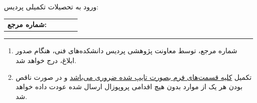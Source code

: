 \documentclass[a4paper,12pt]{article}
\begin{document}
\begin{center}
		\vspace{1.5cm}
		
		\begin{flushright}
			\hspace{2.5cm} ورود به تحصیلات تکمیلی پردیس:
		\end{flushright}
		
		\vspace{0.5cm}
		
		\begin{tabular}{r c c c c}
			\textbf{شماره مرجع:} &
			\fbox{\phantom{000}} & \fbox{\phantom{000}} &
			\fbox{\phantom{000}} & \fbox{\phantom{00000}}
		\end{tabular}
		
	\end{center}
	
	
	\vfill
	
	\begin{center}
		\color{utblue}
		\rule{0.9\textwidth}{1.2pt}
	\end{center}
	
	\begin{flushright}
		\small
		\begin{enumerate}[label=\arabic*., leftmargin=1.5cm, nosep, itemsep=5pt]
			\item شماره مرجع، توسط معاونت پژوهشی پردیس دانشکده‌های فنی، هنگام صدور ابلاغ، درج خواهد شد.
			\item تکمیل \underline{کلیه قسمت‌های فرم بصورت تایپ شده ضروری می‌باشد} و در صورت ناقص بودن هر یک از موارد بدون هیچ اقدامی پروپوزال ارسال شده عودت داده خواهد شد.
		\end{enumerate}
	\end{flushright}
	
	\vspace{0.5cm}
	
	
	
	\newpage
	
\end{document}
